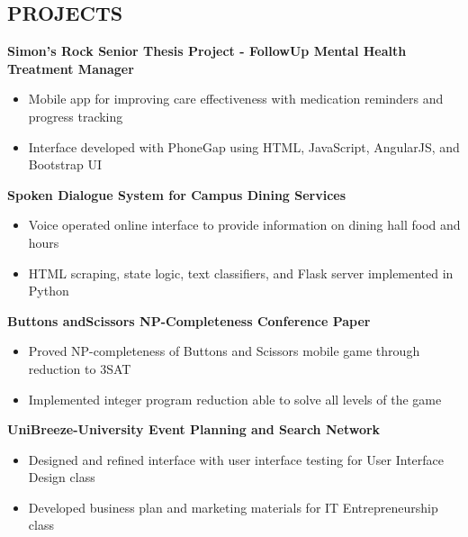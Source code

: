 \documentclass{res}
\begin{document}
\begin{resume}
\section{PROJECTS} 
{\bf Simon's Rock Senior Thesis Project - FollowUp Mental Health Treatment Manager}
\begin{itemize}
\item Mobile app for improving care effectiveness with medication reminders and progress tracking
\item Interface developed with PhoneGap using HTML, JavaScript, AngularJS, and Bootstrap UI
\end{itemize}
\vspace*{-\baselineskip}\leavevmode
{\bf Spoken Dialogue System for Campus Dining Services}
\begin{itemize}
\item Voice operated online interface to provide information on dining hall food and hours 
\item HTML scraping, state logic, text classifiers, and Flask server implemented in Python
\end{itemize}
\vspace*{-\baselineskip}\leavevmode
{\bf Buttons andScissors NP-Completeness Conference Paper}
\begin{itemize}
\item Proved NP-completeness of Buttons and Scissors mobile game through reduction to 3SAT
\item Implemented integer program reduction able to solve all levels of the game
\end{itemize}
\vspace*{-\baselineskip}\leavevmode
{\bf UniBreeze-University Event Planning and Search Network}
\begin{itemize}
\item Designed and refined interface with user interface testing for User Interface Design class
\item Developed business plan and marketing materials for IT Entrepreneurship class
\end{itemize}


\end{resume}
\end{document}
